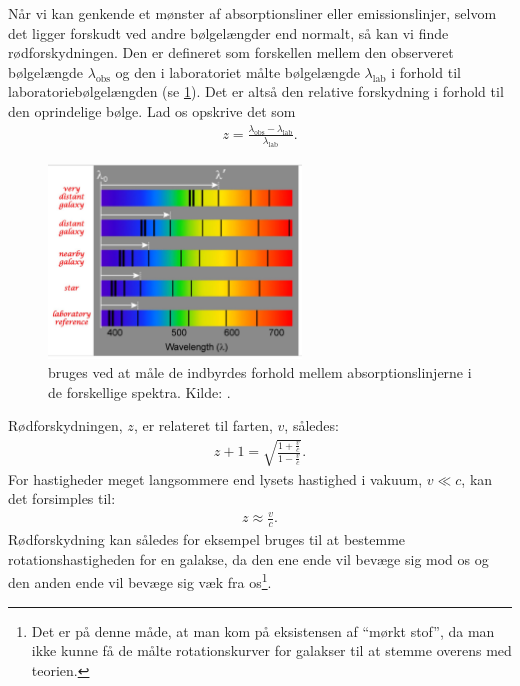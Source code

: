 \documentclass[crop=false, class=memoir]{standalone}
\begin{document}
Når vi kan genkende et mønster af absorptionsliner eller emissionslinjer, selvom det ligger forskudt ved andre bølgelængder end normalt, så kan vi finde rødforskydningen. Den er defineret som forskellen mellem den observeret bølgelængde $\lambda_\text{obs}$ og den i laboratoriet målte bølgelængde $\lambda_\text{lab}$ i forhold til laboratoriebølgelængden (se \cref{stjerner:fig:redshiftmeasure}). Det er altså den relative forskydning i forhold til den oprindelige bølge. Lad os opskrive det som
%
\begin{align}
z=\frac{\lambda_\text{obs}-\lambda_\text{lab}}{\lambda_\text{lab}}. \label{stjerner:eq:redshifty}
\end{align}
%
\begin{figure}
	\centering
	\includegraphics[width=0.6\textwidth]{fig/redshiftcomparison.jpg}
	\caption{ bruges ved at måle de indbyrdes forhold mellem absorptionslinjerne i de forskellige spektra. Kilde: \cite{SNC1DEarthSpace}.}
    \label{stjerner:fig:redshiftmeasure}
\end{figure}
%
Rødforskydningen, $z$, er relateret til farten, $v$, således:
\begin{align}
z+1=\sqrt{\frac{1+\frac{v}{c}}{1-\frac{v}{c}}}.
\end{align}
For hastigheder meget langsommere end lysets hastighed i vakuum, $v \ll c$, kan det forsimples til:
\begin{align}
z\approx\frac{v}{c}.
\end{align}
%
Rødforskydning kan således for eksempel bruges til at bestemme rotationshastigheden for en galakse, da den ene ende vil bevæge sig mod os og den anden ende vil bevæge sig væk fra os\footnote{Det er på denne måde, at man kom på eksistensen af ``mørkt stof'', da man ikke kunne få de målte rotationskurver for galakser til at stemme overens med teorien.}. 
\end{document}
